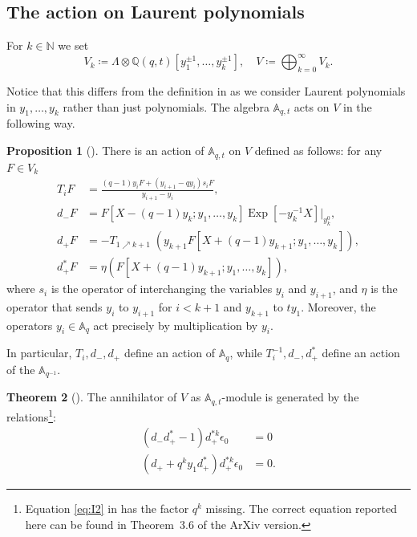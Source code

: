 \documentclass[reqno]{amsart}
\theoremstyle{plain}
\theoremstyle{definition}
\newtheorem{theorem}{Theorem}[section]
\newtheorem{proposition}[theorem]{Proposition}
\theoremstyle{remark}
\DeclareMathOperator{\Exp}{Exp}
\newcommand{\N}{\mathbb{N}}
\newcommand{\Q}{\mathbb{Q}}
\newcommand{\A}{\mathbb{A}}%
\newcommand{\<}{\langle}
\renewcommand{\>}{\rangle}
\begin{document}
\subsection{The action on Laurent polynomials}

For $k \in \N$ we set 
\[ V_k \coloneqq \Lambda \otimes \Q(q,t)[y_1^{\pm 1}, \dots, y_k^{\pm 1}], \quad V \coloneqq \bigoplus_{k=0}^\infty V_k. \]

Notice that this differs from the definition in \cites{CarlssonMellit2018ShuffleConjecture, Mellit2021Rational} as we consider Laurent polynomials in $y_1, \dots, y_k$ rather than just polynomials. The algebra $\A_{q,t}$ acts on $V$ in the following way.

\begin{proposition}[{\cite[Propositions~3.3 and 3.4]{Mellit2021Rational}}]
    There is an action of $\A_{q,t}$ on $V$ defined as follows: for any $F\in V_k$
    \begin{align}
        T_i F & = \frac{(q-1) y_i F + (y_{i+1} - q y_i) s_i F}{y_{i+1} - y_i}, \\
        d_- F & = F[X - (q-1) y_k;y_1,\ldots,y_k] \Exp[-y_k^{-1} X]\Big|_{y_k^0}, \\
        d_+ F & = -T_{1 \nearrow k+1}\; (y_{k+1} F[X+(q-1) y_{k+1}; y_1, \ldots, y_k]), \\
        d_+^* F & = \eta\left(F[X + (q-1) y_{k+1}; y_1, \ldots, y_k]\right),
    \end{align}
    where $s_i$ is the operator of interchanging the variables $y_i$ and $y_{i+1}$, and $\eta$ is the operator that sends $y_i$ to $y_{i+1}$ for $i<k+1$ and $y_{k+1}$ to $t y_1$. Moreover, the operators $y_i \in \A_q$ act precisely by multiplication by $y_i$.

    In particular, $T_i, d_-, d_+$ define an action of $\A_q$, while $T_i^{-1}, d_-, d_+^*$ define an action of the $\A_{q^{-1}}$.
\end{proposition}

\begin{theorem}[{\cite[Theorem~3.3]{Mellit2021Rational}}]
    \label{thm:annihilator}
    The annihilator of $V$ as $\A_{q,t}$-module is generated by the relations\footnote{Equation \eqref{eq:I2} in \cite{Mellit2021Rational} has the factor $q^k$ missing. The correct equation reported here can be found in Theorem~3.6 of the ArXiv version.}:
    \begin{align}
        (d_- d_+^* -1) d_+^{*k} \epsilon_0 & = 0 \label{eq:I1} \tag{I1} \\
        (d_+ + q^k y_1 d_+^* ) d_+^{*k} \epsilon_0 & = 0. \label{eq:I2} \tag{I2}
    \end{align}
\end{theorem}
\end{document}
